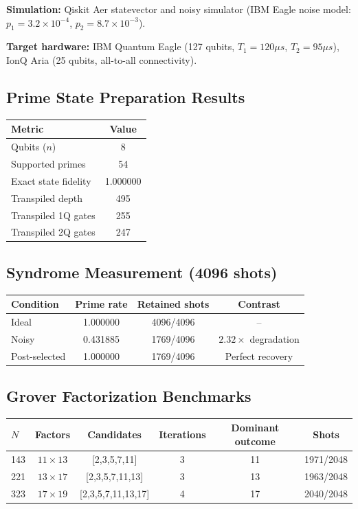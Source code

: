 \documentclass[11pt,letterpaper]{article}
\begin{document}
\textbf{Simulation:} Qiskit Aer statevector and noisy simulator (IBM Eagle noise model: $p_1 = 3.2 \times 10^{-4}$, $p_2 = 8.7 \times 10^{-3}$).

\textbf{Target hardware:} IBM Quantum Eagle (127 qubits, $T_1 = 120\mu s$, $T_2 = 95\mu s$), IonQ Aria (25 qubits, all-to-all connectivity).

\subsection{Prime State Preparation Results}

\begin{center}
\begin{tabular}{lc}
\hline
\textbf{Metric} & \textbf{Value} \\
\hline
Qubits ($n$) & 8 \\
Supported primes & 54 \\
Exact state fidelity & 1.000000 \\
Transpiled depth & 495 \\
Transpiled 1Q gates & 255 \\
Transpiled 2Q gates & 247 \\
\hline
\end{tabular}
\end{center}

\subsection{Syndrome Measurement (4096 shots)}

\begin{center}
\begin{tabular}{lccc}
\hline
\textbf{Condition} & \textbf{Prime rate} & \textbf{Retained shots} & \textbf{Contrast} \\
\hline
Ideal & 1.000000 & 4096/4096 & -- \\
Noisy & 0.431885 & 1769/4096 & $2.32\times$ degradation \\
Post-selected & 1.000000 & 1769/4096 & Perfect recovery \\
\hline
\end{tabular}
\end{center}

\subsection{Grover Factorization Benchmarks}

\begin{center}
\begin{tabular}{lccccc}
\hline
$N$ & Factors & Candidates & Iterations & Dominant outcome & Shots \\
\hline
143 & $11 \times 13$ & [2,3,5,7,11] & 3 & 11 & 1971/2048 \\
221 & $13 \times 17$ & [2,3,5,7,11,13] & 3 & 13 & 1963/2048 \\
323 & $17 \times 19$ & [2,3,5,7,11,13,17] & 4 & 17 & 2040/2048 \\
\hline
\end{tabular}
\end{center}
\end{document}
